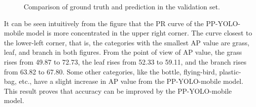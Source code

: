 \documentclass[sensors,article,submit,moreauthors,pdftex]{Definitions/mdpi}
\begin{document}
\begin{figure}[htbp]
\centering
{}
\quad
{}
\caption{Comparison of ground truth and prediction in the validation set.}
\label{fig:prc}
\end{figure}

It can be seen intuitively from the figure that the PR curve of the PP-YOLO-mobile model is more concentrated in the upper right corner. 
The curve closest to the lower-left corner, that is, the categories with the smallest AP value are grass, leaf, and branch in both figures.
From the point of view of AP value, the grass rises from 49.87 to 72.73, the leaf rises from 52.33 to 59.11, and the branch rises from 63.82 to 67.80. Some other categories, like the bottle, flying-bird, plastic-bag, etc., have a slight increase in AP value from the PP-YOLO-mobile model. This result proves that accuracy can be improved by the PP-YOLO-mobile model.
\end{document}
